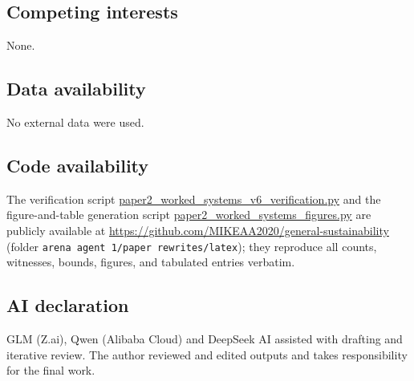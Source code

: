 \documentclass[10pt,twocolumn]{article}
\theoremstyle{definition}
\begin{document}
\subsection*{Competing interests}
None.

\subsection*{Data availability}
No external data were used.

\subsection*{Code availability}
The verification script \url{paper2_worked_systems_v6_verification.py}
and the figure-and-table generation script
\url{paper2_worked_systems_figures.py} are publicly available at
\url{https://github.com/MIKEAA2020/general-sustainability} (folder
\texttt{arena agent 1/paper rewrites/latex}); they reproduce all
counts, witnesses, bounds, figures, and tabulated entries verbatim.

\subsection*{AI declaration}
GLM (Z.ai), Qwen (Alibaba Cloud) and DeepSeek AI assisted with drafting
and iterative review. The author reviewed and edited outputs and takes
responsibility for the final work.
\end{document}
